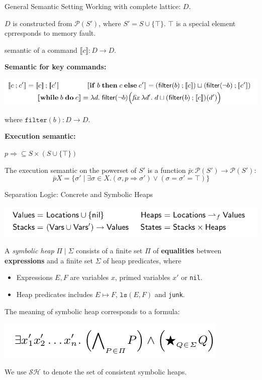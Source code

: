 \documentclass[aspectratio=1610, 13pt]{beamer}
\begin{document}
\begin{frame}{General Semantic Setting}
    Working with complete lattice: $D$. 
    
    $D$ is constructed from $\mathcal{P}(S')$, where $S' = S \cup \{\top\}$. $\top$ is a special element cprresponds to memory fault.
    
    semantic of a command $\llbracket c\rrbracket: D \rightarrow D$.
    
    \textbf{Semantic for key commands:}
    \begin{center}
        \includegraphics[scale=0.4]{semantic.png}
    \end{center}
    where $\texttt{filter}(b): D \rightarrow D$.
    
    \textbf{Execution semantic:}
    
    $p\Longrightarrow\subseteq S\times(S\cup \{\top\})$
    
    The execution semantic on the powerset of $S'$ is a function $\bar{p}: \mathcal{P}(S') \rightarrow \mathcal{P}(S')$: 
    \[\bar{p} X = \{\sigma'\mid \exists \sigma \in X. (\sigma, p \Longrightarrow \sigma') \vee (\sigma = \sigma' = \top)\}\]
\end{frame}

\begin{frame}{Separation Logic: Concrete and Symbolic Heaps}
    \begin{center}
        \includegraphics[scale=0.4]{conc_sema.png}
    \end{center}
    \begin{definition}
    A \emph{symbolic heap} $\Pi\mid \Sigma$ consists of a finite set $\Pi$ of \textbf{equalities} between \textbf{expressions} and a finite set $\Sigma$ of heap predicates, where
    \begin{itemize}
        \item Expressions $E,F$ are variables $x$, primed variables $x'$ or \texttt{nil}.
        \item Heap predicates includes $E\mapsto F$, $\texttt{ls}(E,F)$ and \texttt{junk}.
    \end{itemize}
    \end{definition}
    The meaning of symbolic heap corresponds to a formula:
    \begin{center}
        \includegraphics[scale=0.4]{sl_form.png}
    \end{center}
    We use $\mathcal{SH}$ to denote the set of consistent symbolic heaps.
\end{frame}
\end{document}

